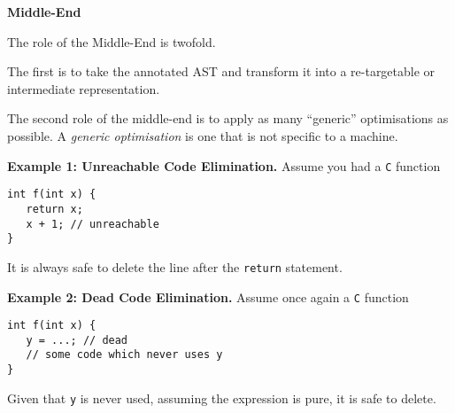 \begin{minipage}[t]{0.15\textwidth}
\textbf{\sffamily Middle-End}    
\end{minipage}%
\begin{minipage}[t]{0.85\textwidth}
    \setlength{\parskip}{.5\baselineskip}
    
    The role of the Middle-End is twofold.

    The first is to take the annotated AST and transform it into a re-targetable or intermediate representation.

    The second role of the middle-end is to apply as many ``generic'' optimisations as possible. A \emph{generic optimisation} is one that is not specific to a machine.

    \textbf{Example 1: Unreachable Code Elimination.} Assume you had a \texttt{C} function

    \begin{verbatim}
int f(int x) {
   return x;
   x + 1; // unreachable
}
    \end{verbatim}
    It is always safe to delete the line after the \texttt{return} statement. 

    \textbf{Example 2: Dead Code Elimination.} Assume once again a \texttt{C} function

    \begin{verbatim}
int f(int x) {
   y = ...; // dead
   // some code which never uses y
}
    \end{verbatim}
    Given that \texttt{y} is never used, assuming the expression is pure, it is safe to delete.

\end{minipage}

